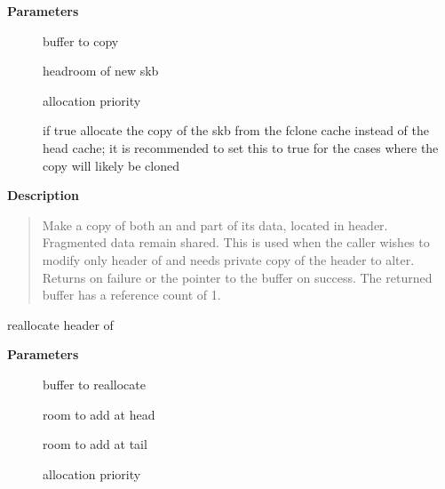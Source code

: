 \documentclass[a4paper,8pt,english]{sphinxmanual}
\begin{document}
\textbf{Parameters}
\begin{description}
\item[{}] \leavevmode
buffer to copy

\item[{}] \leavevmode
headroom of new skb

\item[{}] \leavevmode
allocation priority

\item[{}] \leavevmode
if true allocate the copy of the skb from the fclone
cache instead of the head cache; it is recommended to set this
to true for the cases where the copy will likely be cloned

\end{description}

\textbf{Description}
\begin{quote}

Make a copy of both an {\hyperref[networking/kapi:c.sk_buff]{\emph{}}} and part of its data, located
in header. Fragmented data remain shared. This is used when
the caller wishes to modify only header of {\hyperref[networking/kapi:c.sk_buff]{\emph{}}} and needs
private copy of the header to alter. Returns  on failure
or the pointer to the buffer on success.
The returned buffer has a reference count of 1.
\end{quote}

\begin{fulllineitems}
\label{networking/kapi:c.pskb_expand_head}
reallocate header of {\hyperref[networking/kapi:c.sk_buff]{\emph{}}}

\end{fulllineitems}


\textbf{Parameters}
\begin{description}
\item[{}] \leavevmode
buffer to reallocate

\item[{}] \leavevmode
room to add at head

\item[{}] \leavevmode
room to add at tail

\item[{}] \leavevmode
allocation priority

\end{description}
\end{document}
